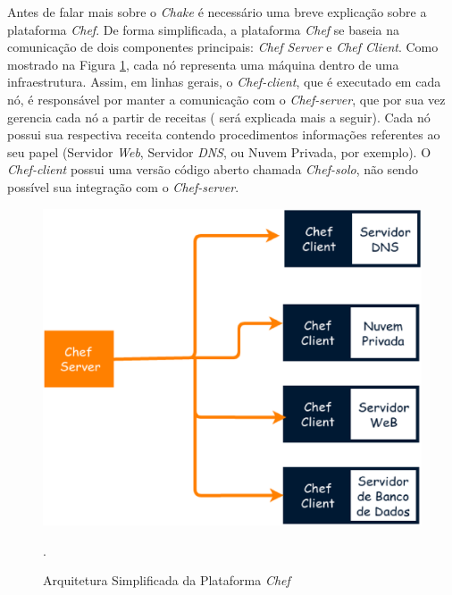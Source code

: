 Antes de falar mais sobre o \textit{Chake} é necessário uma breve explicação sobre a plataforma \textit{Chef}. De forma simplificada, a plataforma \textit{Chef} se baseia na comunicação de dois componentes principais: \textit{Chef Server} e \textit{Chef Client}. Como mostrado na Figura \ref{chefarc}, cada nó representa uma máquina dentro de uma infraestrutura. Assim, em linhas gerais, o \textit{Chef-client}, que é executado em cada nó, é responsável por manter a comunicação com o \textit{Chef-server}, que por sua vez gerencia cada nó a partir de receitas ( será explicada mais a seguir). Cada nó possui sua respectiva receita contendo procedimentos informações referentes ao seu papel (Servidor \textit{Web}, Servidor \textit{DNS}, ou Nuvem Privada, por exemplo). O \textit{Chef-client} possui uma versão código aberto chamada \textit{Chef-solo}, não sendo possível sua integração com o \textit{Chef-server}.

\begin{figure}[!htb]
\centering
\includegraphics [keepaspectratio=true,scale=0.350]{figuras/chef_arc.eps}
\caption{Arquitetura Simplificada da Plataforma \textit{Chef}}
\cite{chef}.
\label{chefarc}
\end{figure}


